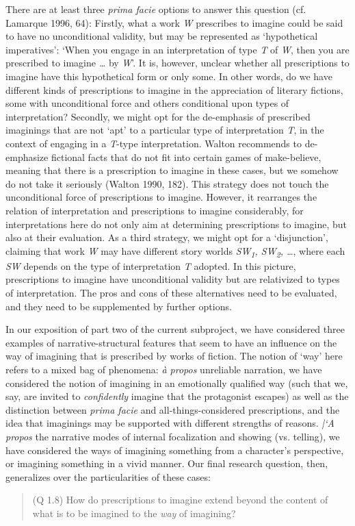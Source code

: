 \noindent There are at least three \emph{prima facie} options to answer this
question (cf. Lamarque 1996, 64): Firstly, what a work \emph{W}
prescribes to imagine could be said to have no unconditional validity,
but may be represented as `hypothetical imperatives': `When you engage
in an interpretation of type \emph{T} of \emph{W}, then you are
prescribed to imagine \emph{\ldots} by \emph{W}'. It is, however,
unclear whether all prescriptions to imagine have this hypothetical form
or only some. In other words, do we have different kinds of
prescriptions to imagine in the appreciation of literary fictions, some
with unconditional force and others conditional upon types of
interpretation? Secondly, we might opt for the de-emphasis of prescribed
imaginings that are not `apt' to a particular type of interpretation
\emph{T}, in the context of engaging in a \emph{T}-type interpretation.
Walton recommends to de-emphasize fictional facts that do not fit into
certain games of make-believe, meaning that there is a prescription to
imagine in these cases, but we somehow do not take it seriously (Walton
1990, 182). This strategy does not touch the unconditional force of
prescriptions to imagine. However, it rearranges the relation of
interpretation and prescriptions to imagine considerably, for
interpretations here do not only aim at determining prescriptions to
imagine, but also at their evaluation. As a third strategy, we might opt
for a `disjunction', claiming that work \emph{W} may have different
story worlds \emph{SW\textsubscript{1}, SW\textsubscript{2}, \ldots},
where each \emph{SW} depends on the type of interpretation \emph{T}
adopted. In this picture, prescriptions to imagine have unconditional
validity but are relativized to types of interpretation. The pros and
cons of these alternatives need to be evaluated, and they need to be
supplemented by further options. 

In our exposition of part two of the current subproject, we have
considered three examples of narrative-structural features that seem to
have an influence on the way of imagining that is prescribed by works of
fiction. The notion of `way' here refers to a mixed bag of phenomena:
\emph{\`a propos} unreliable narration, we have considered the notion of
imagining in an emotionally qualified way (such that we, say, are
invited to \emph{confidently} imagine that the protagonist escapes) as
well as the distinction between \emph{prima facie} and
all-things-considered prescriptions, and the idea that imaginings may be
supported with different strengths of reasons. \emph{|`A propos} the
narrative modes of internal focalization and showing (vs. telling), we
have considered the ways of imagining something from a character's
perspective, or imagining something in a vivid manner. Our final
research question, then, generalizes over the particularities of these
cases:

\vspace{-.2cm}
\begin{quote}
(Q 1.8) How do prescriptions to imagine extend beyond the content of
what is to be imagined to the  \emph{way} of imagining?
\end{quote}
\vspace{-.2cm}

